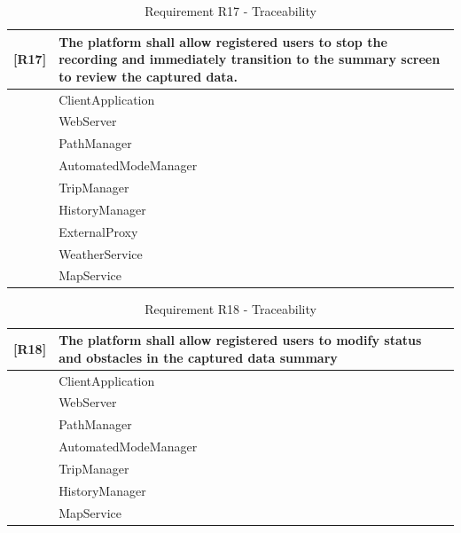 \begin{table}[H]
    \centering
    \begin{tabular}{|p{1cm}|p{14cm}|}
    \hline
    \textbf{[R17]} & \textbf{The platform shall allow registered users to stop the recording and immediately transition to the summary screen to review the captured data.} \\ \hline
    [C1] & ClientApplication \\ \hline
    [C2] & WebServer \\ \hline
    [C7] & PathManager \\ \hline
    [C8] & AutomatedModeManager \\ \hline
    [C11] & TripManager \\ \hline
    [C12] & HistoryManager \\ \hline
    [C17] & ExternalProxy \\ \hline
    [E1] & WeatherService \\ \hline
    [E2] & MapService \\ \hline
    \end{tabular}
    \caption{Requirement R17 - Traceability}
    \label{tab:RT17}
\end{table}

\begin{table}[H]
    \centering
    \begin{tabular}{|p{1cm}|p{14cm}|}
    \hline
    \textbf{[R18]} & \textbf{The platform shall allow registered users to modify status and obstacles in the captured data
    summary} \\ \hline
    [C1] & ClientApplication \\ \hline
    [C2] & WebServer \\ \hline
    [C7] & PathManager \\ \hline
    [C8] & AutomatedModeManager \\ \hline
    [C11] & TripManager \\ \hline
    [C12] & HistoryManager \\ \hline
    [E2] & MapService \\ \hline
    \end{tabular}
    \caption{Requirement R18 - Traceability}
    \label{tab:RT18}
\end{table}

